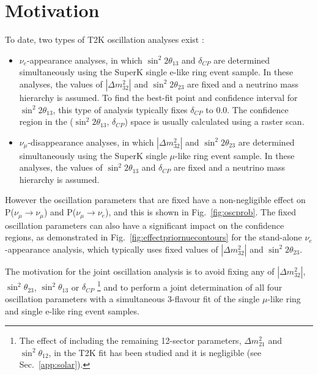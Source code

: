 

\section {Motivation}
\label{sec:motivation}

To date, two types of T2K oscillation analyses exist \cite{OurRun123DisappAnalysis3Flavour, NueRun123Analysis}:
\begin{itemize}
\item
  $\nu_{e}$-appearance analyses,
  in which $\sin^{2}2\theta_{13}$ and $\delta_{CP}$ are determined simultaneously using the SuperK single e-like ring event sample.
  In these analyses, the values of $|\Delta m_{32}^{2}|$ and $\sin^{2}2\theta_{23}$ are fixed
  and a neutrino mass hierarchy is assumed. To find the best-fit point and confidence interval for $\sin^{2}2\theta_{13}$, this type 
  of analysis typically fixes $\delta_{CP}$ to 0.0. The confidence region in the ($\sin^{2}2\theta_{13}$, $\delta_{CP}$) space is 
  usually calculated using a raster scan.
\item
  $\nu_{\mu}$-disappearance analyses, 
  in which $|\Delta m_{32}^{2}|$ and $\sin^{2}2\theta_{23}$ are determined simultaneously using the SuperK single $\mu$-like ring event sample.
  In these analyses, the values of $\sin^{2}2\theta_{13}$ and $\delta_{CP}$ are fixed
  and a neutrino mass hierarchy is assumed.
\end{itemize}

\noindent
However the oscillation parameters that are fixed have a non-negligible effect on P($\nu_{\mu}$$\rightarrow$$\nu_{\mu}$) and P($\nu_{\mu}$$\rightarrow$$\nu_{e}$), 
and this is shown in Fig.\ \ref{fig:oscprob}. 
The fixed oscillation parameters can also have a significant impact on the confidence regions, 
as demonstrated in Fig.\ \ref{fig:effectpriornuecontours} for the 
stand-alone $\nu_{e}$-appearance analysis, 
which typically uses fixed values of $|\Delta m_{32}^{2}|$ and $\sin^{2}2\theta_{23}$. 

The motivation for the joint oscillation analysis is to avoid fixing any of $|\Delta m_{32}^{2}|$,  $\sin^{2}\theta_{23}$, $\sin^{2}\theta_{13}$ or $\delta_{CP}$
\footnote{The effect of including the remaining 12-sector parameters, $\Delta m_{21}^{2}$ and $\sin^{2}\theta_{12}$, in the T2K fit has been studied and 
it is negligible (see Sec.\ \ref{app:solar}).}
and to perform a joint determination of all four oscillation parameters 
with a simultaneous 3-flavour fit of the single $\mu$-like ring and single e-like ring event samples.


